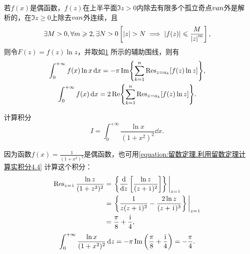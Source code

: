 \begin{figure}[ht]
\centering
{}
\caption{}
\label{figure:留数定理.利用留数定理计算实积分4的辅助积分路径2}
\end{figure}
若\(f(x)\)是偶函数，\(f(z)\)在上半平面\(\Im z > 0\)内除去有限多个孤立奇点\(v{a}{n}\)外是解析的，在\(\Im z \geqslant 0\)上除去\(v{a}{n}\)外连续，且\[
\exists M>0,\forall m\geqslant2, \exists N>0 \left[
\abs{z}>N
\implies
\abs{f(z)}\leqslant\frac{M}{\abs{z}^m}
\right],
\]则令\(F(z) = f(z) \ln z\)，并取如\cref{figure:留数定理.利用留数定理计算实积分4的辅助积分路径2} 所示的辅助围线，则有\begin{gather}
\int_0^{+\infty} f(x) \ln x \dd{x}
= -\pi \Im{ \sum\limits_{k=1}^n \operatorname{Res}_{z=a_k}[ f(z) \ln z ] }, \label{equation:留数定理.利用留数定理计算实积分4.4} \\
\int_0^{+\infty} f(x) \dd{x}
= 2 \Re{ \sum\limits_{k=1}^n \operatorname{Res}_{z=a_k}[ f(z) \ln z ] }. \label{equation:留数定理.利用留数定理计算实积分4.5}
\end{gather}

\begin{example}
计算积分\[
I = \int_0^{+\infty} \frac{\ln x}{(1+x^2)^2} \dd{x}.
\]
\begin{solution}
因为函数\(f(x) = \frac{1}{(1+x^2)^2}\)是偶函数，也可用\cref{equation:留数定理.利用留数定理计算实积分4.4} 计算这个积分：\begin{align*}
\Res_{z=\iu} \frac{\ln z}{(1+z^2)^2}
&= \eval{\left\{ \dv{z} \left[ \frac{\ln z}{(z+\iu)^2} \right] \right\}}_{z=\iu} \\
&= \eval{\left\{ \frac{1}{z(z+\iu)^2} - \frac{2 \ln z}{(z+\iu)^3} \right\}}_{z=\iu} \\
&= \frac{\pi}{8} + \frac{\iu}{4},
\end{align*}\[
\int_0^{+\infty} \frac{\ln x}{(1+x^2)^2} \dd{z}
= -\pi \Im\left(\frac{\pi}{8}+\frac{\kern1pt\mathrm{i}\kern1pt}{4}\right) = -\frac{\pi}{4}.
\]
\end{solution}
\end{example}

